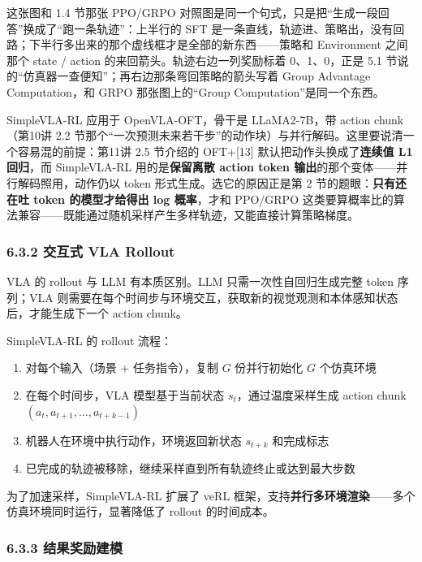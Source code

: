 \documentclass[
  chinese,
]{ctexart}
\providecommand{\tightlist}{%
  \setlength{\itemsep}{0pt}\setlength{\parskip}{0pt}}
\begin{document}
这张图和 1.4 节那张 PPO/GRPO
对照图是同一个句式，只是把``生成一段回答''换成了``跑一条轨迹''：上半行的
SFT
是一条直线，轨迹进、策略出，没有回路；下半行多出来的那个虚线框才是全部的新东西------策略和
Environment 之间那个 state / action 的来回箭头。轨迹右边一列奖励标着
0、1、0，正是 5.1 节说的``仿真器一查便知''；再右边那条弯回策略的箭头写着
Group Advantage Computation，和 GRPO 那张图上的``Group
Computation''是同一个东西。

SimpleVLA-RL 应用于 OpenVLA-OFT，骨干是 LLaMA2-7B，带 action
chunk（第10讲 2.2
节那个``一次预测未来若干步''的动作块）与并行解码。这里要说清一个容易混的前提：第11讲
2.5 节介绍的 OFT+{[}13{]} 默认把动作头换成了\textbf{连续值 L1 回归}，而
SimpleVLA-RL 用的是\textbf{保留离散 action token
输出}的那个变体------并行解码照用，动作仍以 token
形式生成。选它的原因正是第 2 节的题眼：\textbf{只有还在吐 token
的模型才给得出 log 概率}，才和 PPO/GRPO
这类要算概率比的算法兼容------既能通过随机采样产生多样轨迹，又能直接计算策略梯度。

\subsubsection{6.3.2 交互式 VLA
Rollout}\label{ux4ea4ux4e92ux5f0f-vla-rollout}

VLA 的 rollout 与 LLM 有本质区别。LLM 只需一次性自回归生成完整 token
序列；VLA
则需要在每个时间步与环境交互，获取新的视觉观测和本体感知状态后，才能生成下一个
action chunk。

SimpleVLA-RL 的 rollout 流程：

\begin{enumerate}
\def\labelenumi{\arabic{enumi}.}
\tightlist
\item
  对每个输入（场景 + 任务指令），复制 \(G\) 份并行初始化 \(G\)
  个仿真环境
\item
  在每个时间步，VLA 模型基于当前状态 \(s_t\)，通过温度采样生成 action
  chunk \((a_t, a_{t+1}, \ldots, a_{t+k-1})\)
\item
  机器人在环境中执行动作，环境返回新状态 \(s_{t+k}\) 和完成标志
\item
  已完成的轨迹被移除，继续采样直到所有轨迹终止或达到最大步数
\end{enumerate}

为了加速采样，SimpleVLA-RL 扩展了 veRL
框架，支持\textbf{并行多环境渲染}------多个仿真环境同时运行，显著降低了
rollout 的时间成本。

\subsubsection{6.3.3
结果奖励建模}\label{ux7ed3ux679cux5956ux52b1ux5efaux6a21}
\end{document}
